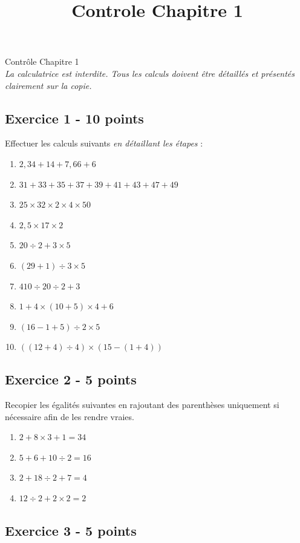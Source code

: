 \documentclass[14 pt]{extarticle}
\title{Controle Chapitre 1}
\date{}
\theoremstyle{plain}
\begin{document}
\begin{center}{\Large Contrôle Chapitre 1}\\ 

\emph{La calculatrice est interdite. Tous les calculs doivent être détaillés et présentés clairement sur la copie. }
 \end{center}
 
  

\subsection*{Exercice 1 - 10 points} 
 
Effectuer les calculs suivants \emph{en détaillant les étapes} : 
 
 \begin{enumerate}
 \item $ 2,34 + 14 + 7,66 + 6 $
 \item $ 31 + 33 +35 + 37 + 39 + 41 +43 + 47 +49 $
 \item $25 \times 32 \times 2 \times 4\times 50$
 \item $ 2,5 \times 17 \times 2 $
 \item $ 20 \div 2 + 3 \times 5$
 \item $ (29 +1)\div 3 \times 5$
 \item $410 \div 20 \div 2 + 3 $
 \item $ 1 + 4 \times (10 + 5) \times 4 + 6$
 \item $ (16 - 1 + 5)\div 2 \times 5$
 \item $ ( ( 12 + 4 ) \div 4 ) \times ( 15 - ( 1 + 4 ) )$
 \end{enumerate}
 
 \subsection*{Exercice 2 - 5 points}
 
 Recopier les égalités suivantes en rajoutant des parenthèses uniquement si nécessaire afin de les rendre vraies. 
 
 \begin{enumerate}
 \item $2 + 8 \times 3 + 1 = 34$
 \item $5 + 6 + 10 \div 2  = 16$
 \item $2 + 18 \div 2 + 7 = 4 $
 \item $ 12 \div 2 + 2 \times 2 = 2 $
 \end{enumerate}
 

 \subsection*{Exercice 3 - 5 points} 
 
\end{document}

